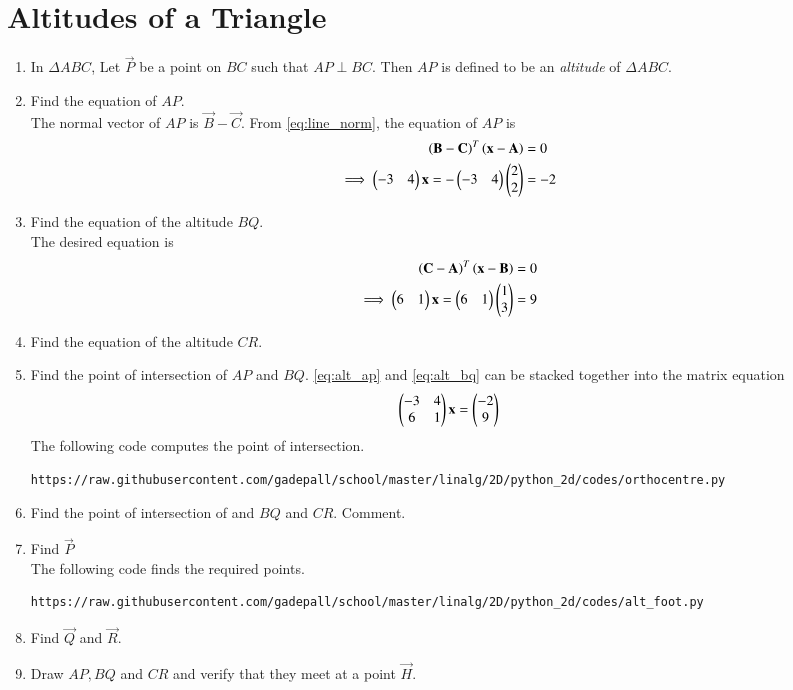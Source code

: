 \documentclass[journal,12pt,twocolumn]{IEEEtran}
\renewcommand\thesection{\arabic{section}}
\begin{document}
\section{Altitudes of a Triangle}
\begin{enumerate}[label=\thesection.\arabic*
,ref=\thesection.\theenumi]
\item
In $\Delta ABC$,  Let $\vec{P}$ be a point on $BC$ such that $AP \perp BC$.  Then $AP$ is defined to be 
an {\em altitude} of $\Delta ABC$.

\item
\label{prob:alt_eq}
Find the equation of $AP$.
\\
\solution The normal vector of $AP$ is $\vec{B} - \vec{C}$. From 
\eqref{eq:line_norm}, the equation of $AP$ is
\begin{align}
\label{eq:alt_ap}
\left(\mathbf{B} - \mathbf{C}\right)^T\left(\mathbf{x} - \mathbf{A}\right)&= 0
\\
\implies \begin{pmatrix}-3&4\end{pmatrix}\mathbf{x} = -\begin{pmatrix}-3&4\end{pmatrix}\begin{pmatrix}2\\2\end{pmatrix} &= -2
\end{align}

%
%
\item Find the equation of the altitude $BQ$.
\\
\solution The desired equation is 
\begin{align}
\label{eq:alt_bq}
\left(\mathbf{C} - \mathbf{A}\right)^T\left(\mathbf{x} - \mathbf{B}\right)&= 0
\\
\implies \begin{pmatrix}6&1\end{pmatrix}\mathbf{x} = \begin{pmatrix}6&1\end{pmatrix}\begin{pmatrix}1\\3\end{pmatrix} &= 9
\end{align}
\item Find the equation of the altitude $CR$.
%
\item Find the point of intersection of $AP$ and $BQ$.
\solution \eqref{eq:alt_ap} and \eqref{eq:alt_bq} can be stacked together into the matrix equation
\begin{align}
\label{eq:alt_mat}
 \begin{pmatrix}-3&4 \\ 6&1\end{pmatrix}\mathbf{x} = \begin{pmatrix}-2\\9\end{pmatrix}
\end{align}
The following code computes the point of intersection.
\begin{lstlisting}
https://raw.githubusercontent.com/gadepall/school/master/linalg/2D/python_2d/codes/orthocentre.py
\end{lstlisting}

\item Find the point of intersection of  and $BQ$ and $CR$. Comment.
\item Find $\vec{P}$
%
\\
\solution The following code finds the required points.
\begin{lstlisting}
https://raw.githubusercontent.com/gadepall/school/master/linalg/2D/python_2d/codes/alt_foot.py
\end{lstlisting}
\item Find $\vec{Q}$ and $\vec{R}$.
\item Draw $AP, BQ$ and $CR$ and verify that they meet at a point 
$\vec{H}$.  

\end{enumerate}
\end{document}
